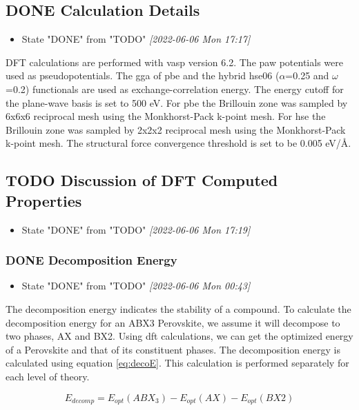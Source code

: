\documentclass[twoside, twocolumn, 9pt, draft]{article}
\begin{document}
\subsection*{{\bfseries\sffamily DONE} Calculation Details}
\label{sec:org939931d}
\begin{itemize}
\item State "DONE"       from "TODO"       \textit{[2022-06-06 Mon 17:17]}
\end{itemize}
DFT calculations are performed with \gls{vasp} version
6.2. The \acrlong{paw} potentials were
used as pseudopotentials. The \acrlong{gga} of \acrshort{pbe} and the hybrid
\acrshort{hse}06 (\(\alpha\)=0.25 and \(\omega\)=0.2) functionals are
used as exchange-correlation energy. The energy cutoff for the
plane-wave basis is set to 500 eV. For \acrshort{pbe} the
Brillouin zone was sampled by 6x6x6 reciprocal mesh using the
Monkhorst-Pack k-point mesh. For \acrshort{hse} the Brillouin
zone was sampled by 2x2x2 reciprocal mesh using the Monkhorst-Pack
k-point mesh. The structural force convergence threshold is set to be
0.005 eV/\AA{}.

\subsection*{{\bfseries\sffamily TODO} Discussion of DFT Computed Properties}
\label{sec:orgeca77d0}
\begin{itemize}
\item State "DONE"       from "TODO"       \textit{[2022-06-06 Mon 17:19]}
\end{itemize}
\subsubsection*{{\bfseries\sffamily DONE} Decomposition Energy}
\label{sec:orgc72adbe}
\begin{itemize}
\item State "DONE"       from "TODO"       \textit{[2022-06-06 Mon 00:43]}
\end{itemize}
The decomposition energy indicates the stability of a compound. To
calculate the decomposition energy for an ABX3 Perovskite, we assume
it will decompose to two phases, AX and BX2. Using
\acrshort{dft} calculations, we can get the optimized energy of
a Perovskite and that of its constituent phases. The decomposition
energy is calculated using equation \eqref{eq:decoE}. This calculation
is performed separately for each level of theory.

\begin{equation}\label{eq:decoE}
E_{decomp} = E_{opt}(ABX_3) - E_{opt}(AX) - E_{opt}(BX2)
\end{equation}
\end{document}
